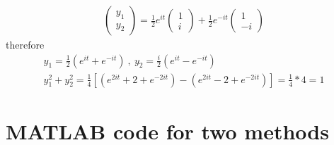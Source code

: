 \documentclass[12pt]{article}
\begin{document}
\begin{enumerate}
\begin{eqnarray*}
			\left( \begin{array}{c}y_1\\y_2\end{array}\right)
			=\frac{1}{2}e^{it}\left(\begin{array}{c}1\\i\end{array} \right)+\frac{1}{2}e^{-it}\left(\begin{array}{c}1\\-i\end{array} \right)
		\end{eqnarray*}
		therefore
		\begin{eqnarray*}
		y_1=\frac{1}{2}(e^{it}+e^{-it})~,~y_2=\frac{i}{2}(e^{it}-e^{-it})\\
		y_1^2+y_2^2=\frac{1}{4}[(e^{2it}+2+e^{-2it})-(e^{2it}-2+e^{-2it})]=\frac{1}{4}*4=1
		\end{eqnarray*}
		\newpage
		\lstset{language=Matlab,showstringspaces=false,breaklines=true}
		\section*{MATLAB code for two methods}
		
	\end{enumerate}
\end{document}
